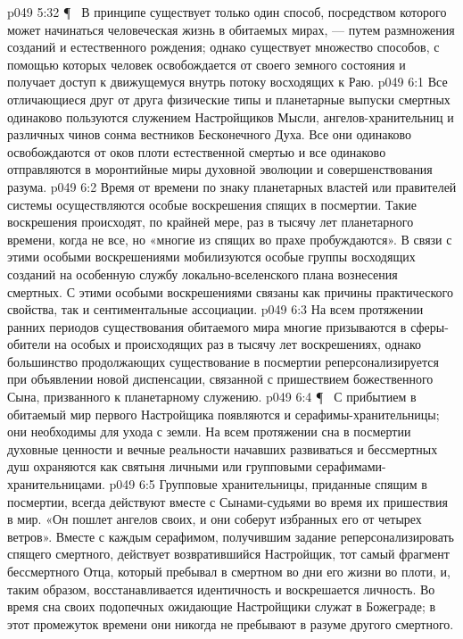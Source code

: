 \vs p049 5:32 \P\ \bibnobreakspace {} В принципе существует только один способ, посредством которого может начинаться человеческая жизнь в обитаемых мирах, --- путем размножения созданий и естественного рождения; однако существует множество способов, с помощью которых человек освобождается от своего земного состояния и получает доступ к движущемуся внутрь потоку восходящих к Раю.
\vs p049 6:1 Все отличающиеся друг от друга физические типы и планетарные выпуски смертных одинаково пользуются служением Настройщиков Мысли, ангелов\hyp{}хранительниц и различных чинов сонма вестников Бесконечного Духа. Все они одинаково освобождаются от оков плоти естественной смертью и все одинаково отправляются в моронтийные миры духовной эволюции и совершенствования разума.
\vs p049 6:2 Время от времени по знаку планетарных властей или правителей системы осуществляются особые воскрешения спящих в посмертии. Такие воскрешения происходят, по крайней мере, раз в тысячу лет планетарного времени, когда не все, но «многие из спящих во прахе пробуждаются». В связи с этими особыми воскрешениями мобилизуются особые группы восходящих созданий на особенную службу локально\hyp{}вселенского плана вознесения смертных. С этими особыми воскрешениями связаны как причины практического свойства, так и сентиментальные ассоциации.
\vs p049 6:3 На всем протяжении ранних периодов существования обитаемого мира многие призываются в сферы\hyp{}обители на особых и происходящих раз в тысячу лет воскрешениях, однако большинство продолжающих существование в посмертии реперсонализируется при объявлении новой диспенсации, связанной с пришествием божественного Сына, призванного к планетарному служению.
\vs p049 6:4 \P\ \bibnobreakspace {} С прибытием в обитаемый мир первого Настройщика появляются и серафимы\hyp{}хранительницы; они необходимы для ухода с земли. На всем протяжении сна в посмертии духовные ценности и вечные реальности начавших развиваться и бессмертных душ охраняются как святыня личными или групповыми серафимами\hyp{}хранительницами.
\vs p049 6:5 Групповые хранительницы, приданные спящим в посмертии, всегда действуют вместе с Сынами\hyp{}судьями во время их пришествия в мир. «Он пошлет ангелов своих, и они соберут избранных его от четырех ветров». Вместе с каждым серафимом, получившим задание реперсонализировать спящего смертного, действует возвратившийся Настройщик, тот самый фрагмент бессмертного Отца, который пребывал в смертном во дни его жизни во плоти, и, таким образом, восстанавливается идентичность и воскрешается личность. Во время сна своих подопечных ожидающие Настройщики служат в Божеграде; в этот промежуток времени они никогда не пребывают в разуме другого смертного.
